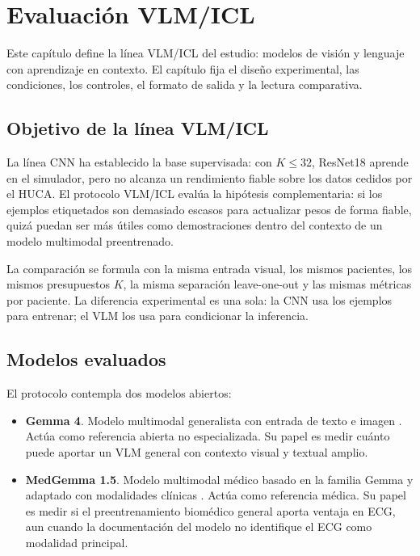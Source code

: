 \chapter{Evaluación VLM/ICL}
\label{chap:vlm}

Este capítulo define la línea VLM/ICL del estudio: modelos de visión y lenguaje con aprendizaje en contexto. El capítulo fija el diseño experimental, las condiciones, los controles, el formato de salida y la lectura comparativa.

\section{Objetivo de la línea VLM/ICL}

La línea CNN ha establecido la base supervisada: con \(K \leq 32\), ResNet18 aprende en el simulador, pero no alcanza un rendimiento fiable sobre los datos cedidos por el HUCA. El protocolo VLM/ICL evalúa la hipótesis complementaria: si los ejemplos etiquetados son demasiado escasos para actualizar pesos de forma fiable, quizá puedan ser más útiles como demostraciones dentro del contexto de un modelo multimodal preentrenado.

La comparación se formula con la misma entrada visual, los mismos pacientes, los mismos presupuestos \(K\), la misma separación leave-one-out y las mismas métricas por paciente. La diferencia experimental es una sola: la CNN usa los ejemplos para entrenar; el VLM los usa para condicionar la inferencia.

\section{Modelos evaluados}

El protocolo contempla dos modelos abiertos:

\begin{itemize}
  \item \textbf{Gemma 4}. Modelo multimodal generalista con entrada de texto e imagen \cite{gemma4card}. Actúa como referencia abierta no especializada. Su papel es medir cuánto puede aportar un VLM general con contexto visual y textual amplio.
  \item \textbf{MedGemma 1.5}. Modelo multimodal médico basado en la familia Gemma y adaptado con modalidades clínicas \cite{medgemma15}. Actúa como referencia médica. Su papel es medir si el preentrenamiento biomédico general aporta ventaja en ECG, aun cuando la documentación del modelo no identifique el ECG como modalidad principal.
\end{itemize}


